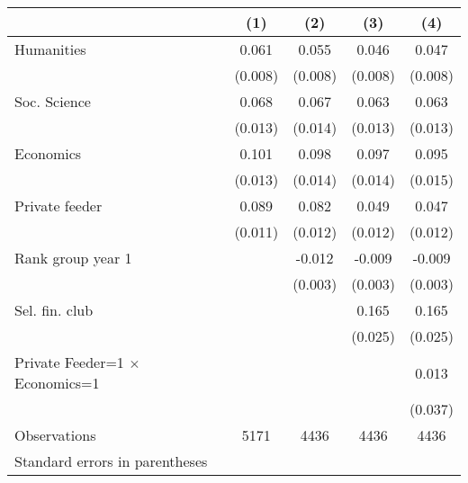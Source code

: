 \begin{tabular}{l*{4}{c}}
\toprule
                    &\multicolumn{1}{c}{(1)}&\multicolumn{1}{c}{(2)}&\multicolumn{1}{c}{(3)}&\multicolumn{1}{c}{(4)}\\
\midrule
Humanities          &       0.061&       0.055&       0.046&       0.047\\
                    &     (0.008)&     (0.008)&     (0.008)&     (0.008)\\
\addlinespace
Soc. Science        &       0.068&       0.067&       0.063&       0.063\\
                    &     (0.013)&     (0.014)&     (0.013)&     (0.013)\\
\addlinespace
Economics           &       0.101&       0.098&       0.097&       0.095\\
                    &     (0.013)&     (0.014)&     (0.014)&     (0.015)\\
\addlinespace
Private feeder      &       0.089&       0.082&       0.049&       0.047\\
                    &     (0.011)&     (0.012)&     (0.012)&     (0.012)\\
\addlinespace
Rank group year 1   &            &      -0.012&      -0.009&      -0.009\\
                    &            &     (0.003)&     (0.003)&     (0.003)\\
\addlinespace
Sel. fin. club      &            &            &       0.165&       0.165\\
                    &            &            &     (0.025)&     (0.025)\\
\addlinespace
Private Feeder=1 $\times$ Economics=1&            &            &            &       0.013\\
                    &            &            &            &     (0.037)\\
\midrule
Observations        &        5171&        4436&        4436&        4436\\
\bottomrule
\multicolumn{5}{l}{\footnotesize Standard errors in parentheses}\\
\end{tabular}
